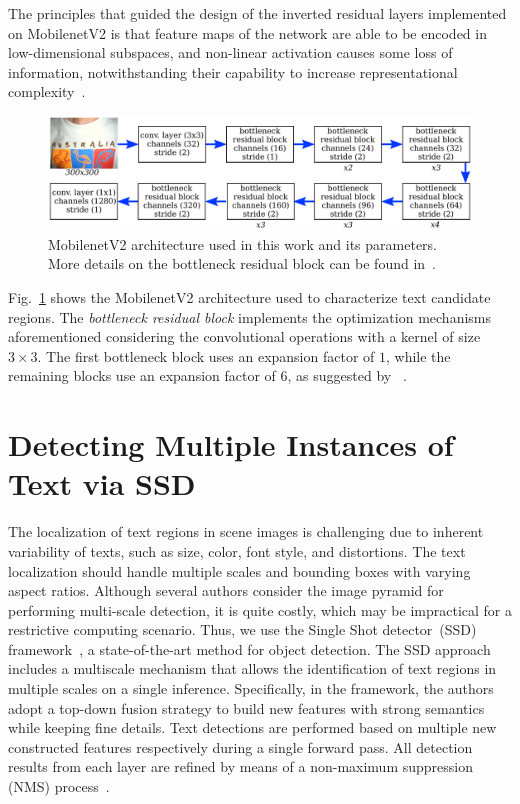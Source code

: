The principles that guided the design of the inverted residual layers implemented on MobilenetV2 is that feature maps of the network are able to be encoded in low-dimensional subspaces, and non-linear activation causes some loss of information, notwithstanding their capability to increase representational complexity~\cite{Sandler2018CVPR}.

\begin{figure}[!ht]
	\centering
	\includegraphics[width=\columnwidth]{ICIP_frankenstein/figs/feature-extraction-v1.pdf}
	\caption{MobilenetV2 architecture used in this work and its parameters. More details on the bottleneck residual block can be found in~\cite{Sandler2018CVPR}.}
	\label{fig:feature-extraction}
\end{figure}

Fig.~\ref{fig:feature-extraction} shows the MobilenetV2 architecture used to characterize text candidate regions. The \textit{bottleneck residual block} implements the optimization mechanisms aforementioned considering the convolutional operations with a kernel of size $3 \times 3$. The first bottleneck block uses an expansion factor of $1$, while the remaining blocks use an expansion factor of $6$, as suggested by ~\cite{Sandler2018CVPR}.

\section{Detecting Multiple Instances of Text via SSD}

The localization of text regions in scene images is challenging due to inherent variability of texts, such as size, color, font style, and distortions. 
The text localization should handle multiple scales and bounding boxes with varying aspect ratios. Although several authors consider the image pyramid for performing multi-scale detection, it is quite costly, which may be impractical for a restrictive computing scenario. Thus, we use the Single Shot detector~(SSD) framework~\cite{Liu2016ECCV}, a state-of-the-art method for object detection. The SSD approach includes a multiscale mechanism that allows the identification of text regions in multiple scales on a single inference. Specifically, in the framework, the authors adopt a top-down fusion strategy to build new features with strong semantics while keeping fine details. Text detections are performed based on multiple new constructed features respectively during a single forward pass. All detection results from each layer are refined by means of a non-maximum suppression (NMS) process~\cite{Neubeck2006ICPR}.

